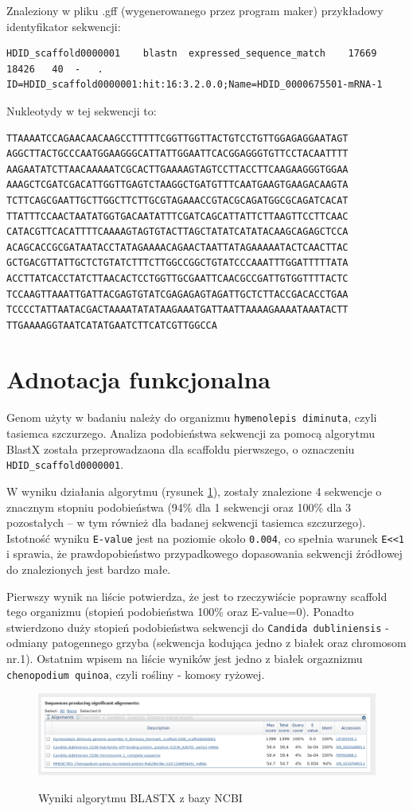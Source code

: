 \documentclass[a4paper]{article}
\begin{document}
Znaleziony w pliku .gff (wygenerowanego przez program maker) przykładowy identyfikator sekwencji:
\begin{lstlisting}
HDID_scaffold0000001	blastn	expressed_sequence_match	17669	18426	40	-	.	ID=HDID_scaffold0000001:hit:16:3.2.0.0;Name=HDID_0000675501-mRNA-1
\end{lstlisting}

Nukleotydy w tej sekwencji to:

\begin{verbatim}
TTAAAATCCAGAACAACAAGCCTTTTTCGGTTGGTTACTGTCCTGTTGGAGAGGAATAGT
AGGCTTACTGCCCAATGGAAGGGCATTATTGGAATTCACGGAGGGTGTTCCTACAATTTT
AAGAATATCTTAACAAAAATCGCACTTGAAAAGTAGTCCTTACCTTCAAGAAGGGTGGAA
AAAGCTCGATCGACATTGGTTGAGTCTAAGGCTGATGTTTCAATGAAGTGAAGACAAGTA
TCTTCAGCGAATTGCTTGGCTTCTTGCGTAGAAACCGTACGCAGATGGCGCAGATCACAT
TTATTTCCAACTAATATGGTGACAATATTTCGATCAGCATTATTCTTAAGTTCCTTCAAC
CATACGTTCACATTTTCAAAAGTAGTGTACTTAGCTATATCATATACAAGCAGAGCTCCA
ACAGCACCGCGATAATACCTATAGAAAACAGAACTAATTATAGAAAAATACTCAACTTAC
GCTGACGTTATTGCTCTGTATCTTTCTTGGCCGGCTGTATCCCAAATTTGGATTTTTATA
ACCTTATCACCTATCTTAACACTCCTGGTTGCGAATTCAACGCCGATTGTGGTTTTACTC
TCCAAGTTAAATTGATTACGAGTGTATCGAGAGAGTAGATTGCTCTTACCGACACCTGAA
TCCCCTATTAATACGACTAAAATATATAAGAAATGATTAATTAAAAGAAAATAAATACTT
TTGAAAAGGTAATCATATGAATCTTCATCGTTGGCCA
\end{verbatim}


\section{Adnotacja funkcjonalna}
Genom użyty w badaniu należy do organizmu \texttt{hymenolepis diminuta}, czyli tasiemca szczurzego.
Analiza podobieństwa sekwencji za pomocą algorytmu BlastX została przeprowadzaona dla scaffoldu pierwszego,
o oznaczeniu \texttt{HDID\_scaffold0000001}.

W wyniku działania algorytmu (rysunek \ref{fig:result}), zostały znalezione 4 sekwencje o znacznym stopniu podobieństwa
(94\% dla 1 sekwencji oraz 100\% dla 3 pozostałych -- w tym również dla badanej sekwencji tasiemca szczurzego).
Istotność wyniku \texttt{E-value} jest na poziomie około \texttt{0.004},
co spełnia warunek \texttt{E<<1} i sprawia, że prawdopobieństwo przypadkowego dopasowania
sekwencji źródłowej do znalezionych jest bardzo małe.

Pierwszy wynik na liście potwierdza, że jest to rzeczywiście poprawny scaffold tego organizmu
(stopień podobieństwa 100\% oraz E-value=0). Ponadto stwierdzono duży stopień podobieństwa sekwencji do \texttt{Candida dubliniensis} - odmiany
patogennego grzyba (sekwencja kodująca jedno z białek oraz chromosom nr.1). Ostatnim wpisem na liście wyników jest jedno z białek orgaznizmu
\texttt{chenopodium quinoa}, czyli rośliny - komosy ryżowej. 

\begin{figure}[h]
    \centering
    \includegraphics[width=1.0\textwidth]{result.png}
    \label{fig:result}
    \caption[]{Wyniki algorytmu BLASTX z bazy NCBI}
\end{figure}
\end{document}
